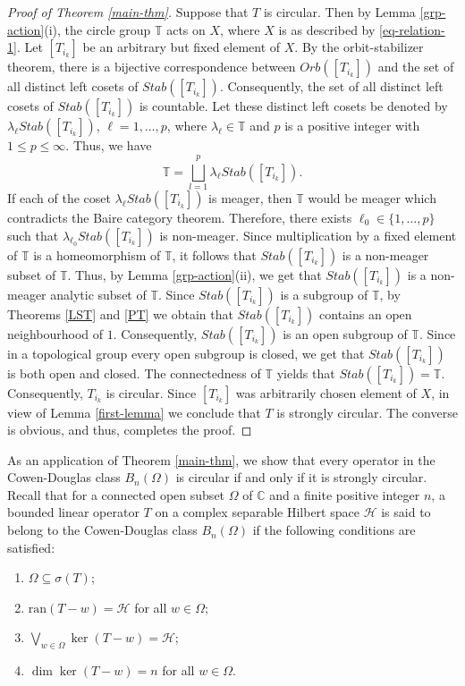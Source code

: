 \documentclass[10pt,a4paper]{amsart}
\begin{document}
\begin{proof}[Proof of Theorem \ref{main-thm}]
Suppose that $T$ is circular. Then by Lemma \ref{grp-action}(i), the circle group $\mathbb T$ acts on $X$, where $X$ is as described by \eqref{eq-relation-1}. Let $[T_{i_k}]$ be an arbitrary but fixed element of $X$. By the orbit-stabilizer theorem, there is a bijective correspondence between $Orb([T_{i_k}])$ and the set of all distinct left cosets of $Stab([T_{i_k}])$. Consequently, the set of all distinct left cosets of $Stab([T_{i_k}])$ is countable. Let these distinct left cosets be denoted by $\lambda_\ell Stab([T_{i_k}])$, $\ell = 1, \ldots, p$, where $\lambda_\ell \in \mathbb T$ and $p$ is a positive integer with $1 \leqslant p \leqslant \infty$. Thus, we have
\[\mathbb T = \bigsqcup_{l=1}^p \lambda_\ell Stab([T_{i_k}]).\]
If each of the coset $\lambda_\ell Stab([T_{i_k}])$ is meager, then $\mathbb T$ would be meager which contradicts the Baire category theorem. Therefore, there exists $\ell_0 \in \{1, \ldots, p\}$ such that $\lambda_{\ell_0} Stab([T_{i_k}])$ is non-meager. Since multiplication by a fixed element of $\mathbb T$ is a homeomorphism of $\mathbb T$, it follows that $Stab([T_{i_k}])$ is a non-meager subset of $\mathbb T$. Thus, by Lemma \ref{grp-action}(ii), we get that $Stab([T_{i_k}])$ is a non-meager analytic subset of $\mathbb T$. Since $Stab([T_{i_k}])$ is a subgroup of $\mathbb T$, by Theorems \ref{LST} and \ref{PT} we obtain that $Stab([T_{i_k}])$ contains an open neighbourhood of $1$. Consequently, $Stab([T_{i_k}])$ is an open subgroup of $\mathbb T$. Since in a topological group every open subgroup is closed, we get that $Stab([T_{i_k}])$ is both open and closed. The connectedness of $\mathbb T$ yields that $Stab([T_{i_k}]) = \mathbb T$. Consequently, $T_{i_k}$ is circular. Since $[T_{i_k}]$ was arbitrarily chosen element of $X$, in view of Lemma \ref{first-lemma} we conclude that $T$ is strongly circular. The converse is obvious, and thus, completes the proof.
\end{proof}


As an application of Theorem \ref{main-thm}, we show that every operator in the Cowen-Douglas class $B_n(\Omega)$ is circular if and only if it is strongly circular. Recall that for a connected open subset $\Omega$ of $\mathbb C$ and a finite positive integer $n$, a bounded linear operator $T$ on a complex separable Hilbert space $\mathcal H$ is said to belong to the Cowen-Douglas class $B_n(\Omega)$ if the following conditions are satisfied:
\begin{enumerate}
\item[(i)] $\Omega \subseteq \sigma(T)$;
\item[(ii)] $\text{ran}(T-w) = \mathcal H$ for all $w \in \Omega$;
\item[(iii)] $\bigvee_{w \in \Omega} \ker (T-w) = \mathcal H$;
\item[(iv)] $\dim \ker (T-w) = n$ for all $w \in \Omega$.
\end{enumerate}  
\end{document}

